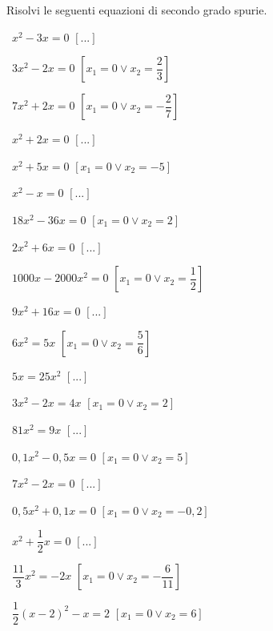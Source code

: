 \begin{esercizio}[\Ast]
\label{ese:3.5}
Risolvi le seguenti equazioni di secondo grado spurie.
\begin{multicols}{2}
 \begin{enumeratea}
 \item~\(x^{2} - 3 x = 0\) \hfill\(\left[...\right]\)
 \item~\(3 x^{2} - 2 x = 0\) 
  \hfill\(\left[x_{1} = 0 \vee x_{2} = \dfrac{2}{3}\right]\)
 \item~\(7 x^{2} + 2 x = 0\) 
  \hfill\(\left[x_{1} = 0 \vee x_{2} = - \dfrac{2}{7}\right]\)
 \item~\(x^{2} + 2 x = 0\) \hfill\(\left[...\right]\)
 \item~\(x^{2} + 5 x = 0\) 
  \hfill\(\left[x_{1} = 0 \vee x_{2} = - 5\right]\)
 \item~\(x^{2} - x = 0\) \hfill\(\left[...\right]\)
 \item~\(18 x^{2} - 36 x = 0\) \hfill\(\left[x_{1} = 0 \vee x_{2} = 2\right]\)
 \item~\(2x^{2} + 6x = 0\) \hfill\(\left[...\right]\)
 \item~\(1000 x - 2000 x^{2} = 0\) \hfill\(\left[x_{1} = 0 \vee x_{2} = 
\dfrac{1}{2}\right]\)
 \item~\(9x^{2} + 16x = 0\) \hfill\(\left[...\right]\)
 \item~\(6 x^{2} = 5 x\) \hfill\(\left[x_{1} = 0 \vee x_{2} = 
\dfrac{5}{6}\right]\)
 \item~\(5x = 25x^{2}\) \hfill\(\left[...\right]\)
 \item~\(3 x^{2} - 2 x = 4 x\) \hfill\(\left[x_{1} = 0 \vee x_{2} = 2\right]\)
 \item~\(81x^{2} = 9x\) \hfill\(\left[...\right]\)
 \item~\(0,1 x^{2} - 0,5 x = 0\) \hfill\(\left[x_{1} = 0 \vee x_{2} = 5\right]\)
 \item~\(7x^{2} - 2x = 0\) \hfill\(\left[...\right]\)
 \item~\(0,5 x^{2} + 0,1 x = 0\) \hfill\(\left[x_{1} = 0 \vee x_{2} = - 
0,2\right]\)
 \item~\(x^{2} + \dfrac{1}{2} x = 0\) \hfill\(\left[...\right]\)
 \item~\(\dfrac{11}{3} x^{2} = - 2 x\) 
  \hfill\(\left[x_{1} = 0 \vee x_{2} = - \dfrac{6}{11}\right]\)
 \item~\(\dfrac{1}{2} ( x - 2 )^{2} - x = 2\)
  \hfill\(\left[x_{1} = 0 \vee x_{2} = 6\right]\)

\end{enumeratea}
\end{multicols}
\end{esercizio}
